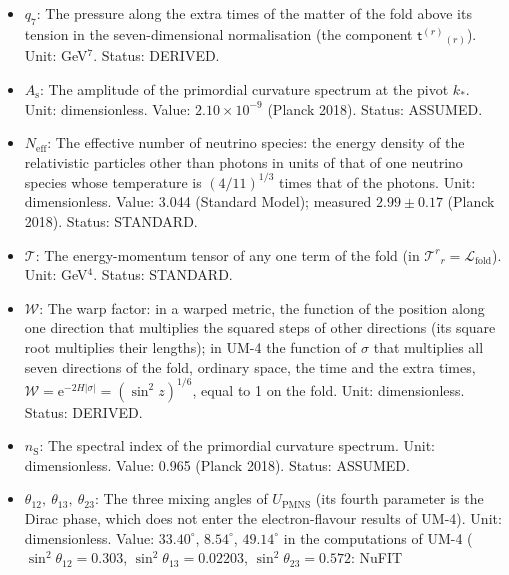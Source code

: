 \documentclass[
  10pt,
]{article}
\begin{document}
\begin{itemize}
  \(\rho_7\): The energy density of the matter of the fold above its
  tension in the seven-dimensional normalisation (minus the component
  \(\mathsf{t}^{(4)}{}_{(4)}\): an energy per unit volume of the six
  other directions of the fold); \(V_*\rho_7\) in the four-dimensional
  normalisation. Unit: GeV\(^7\). Status: DERIVED.
\item
  \(q_7\): The pressure along the extra times of the matter of the fold
  above its tension in the seven-dimensional normalisation (the
  component \(\mathsf{t}^{(r)}{}_{(r)}\)). Unit: GeV\(^7\). Status:
  DERIVED.
\item
  \(A_{\mathrm{s}}\): The amplitude of the primordial curvature spectrum
  at the pivot \(k_*\). Unit: dimensionless. Value:
  \(2.10\times10^{-9}\) (Planck 2018). Status: ASSUMED.
\item
  \(N_{\mathrm{eff}}\): The effective number of neutrino species: the
  energy density of the relativistic particles other than photons in
  units of that of one neutrino species whose temperature is
  \((4/11)^{1/3}\) times that of the photons. Unit: dimensionless.
  Value: 3.044 (Standard Model); measured \(2.99 \pm 0.17\) (Planck
  2018). Status: STANDARD.
\item
  \(\mathcal{T}\): The energy-momentum tensor of any one term of the
  fold (in \(\mathcal{T}^r{}_r = \mathcal{L}_{\mathrm{fold}}\)). Unit:
  GeV\(^4\). Status: STANDARD.
\item
  \(\mathcal{W}\): The warp factor: in a warped metric, the function of
  the position along one direction that multiplies the squared steps of
  other directions (its square root multiplies their lengths); in UM-4
  the function of \(\sigma\) that multiplies all seven directions of the
  fold, ordinary space, the time and the extra times,
  \(\mathcal{W} = \mathrm{e}^{-2H\lvert\sigma\rvert} = (\sin^2z)^{1/6}\),
  equal to 1 on the fold. Unit: dimensionless. Status: DERIVED.
\item
  \(n_{\mathrm{S}}\): The spectral index of the primordial curvature
  spectrum. Unit: dimensionless. Value: 0.965 (Planck 2018). Status:
  ASSUMED.
\item
  \(\theta_{12},\ \theta_{13},\ \theta_{23}\): The three mixing angles
  of \(U_{\mathrm{PMNS}}\) (its fourth parameter is the Dirac phase,
  which does not enter the electron-flavour results of UM-4). Unit:
  dimensionless. Value: \(33.40^\circ\), \(8.54^\circ\), \(49.14^\circ\)
  in the computations of UM-4 (\(\sin^2\theta_{12} = 0.303\),
  \(\sin^2\theta_{13} = 0.02203\), \(\sin^2\theta_{23} = 0.572\): NuFIT

\end{itemize}
\end{document}
